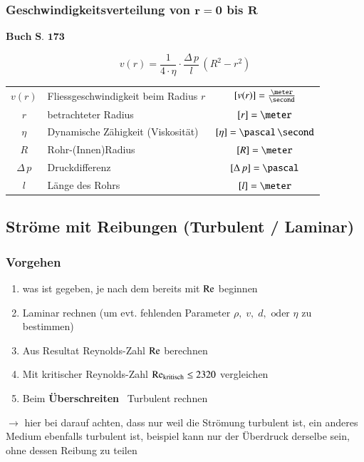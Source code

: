 \subsubsection{Geschwindigkeitsverteilung von $\bm{r=0}$ bis $\bm{R}$}
\begin{flushright}
	$\boxed{\textbf{Buch S. 173}}$
\end{flushright}


$$ \boxed{ v(r) = \frac{1}{4 \cdot \eta} \cdot \frac{\Delta \, p}{l} \, (R^2 - r^2) } $$

\renewcommand{\arraystretch}{1.3}
\begin{tabular}{c l c}
    $v(r)$                              & Fliessgeschwindigkeit beim Radius $r$ & $[v(r)] = \frac{\meter}{\second}$         \\
    $r$                                 & betrachteter Radius                   & $[r] = \meter$                            \\
    $\eta$                              & Dynamische Zähigkeit (Viskosität)     & $[\eta] = \pascal \, \second$             \\
    $R$                                 & Rohr-(Innen)Radius                    & $[R] = \meter$                            \\
    $\Delta \, p$                       & Druckdifferenz                        & $[\Delta \, p] = \pascal$                 \\
    $l$                                 & Länge des Rohrs                       & $[l] = \meter$
\end{tabular}
\renewcommand{\arraystretch}{1}

\subsection{Ströme mit Reibungen (Turbulent / Laminar)}

\subsubsection{Vorgehen}

\begin{enumerate}
	\item was ist gegeben, je nach dem bereits mit $\mathop{} \! \mathrm{Re}$ beginnen
	\item Laminar rechnen (um evt. fehlenden Parameter $\rho, \; v, \; d, \text{ oder } \eta$ zu bestimmen) 
	\item Aus Resultat Reynolds-Zahl $\mathop{} \! \mathrm{Re}$ berechnen
	\item Mit kritischer Reynolds-Zahl $\mathop{} \! \mathrm{Re}_{\rm kritisch} \le 2320$ vergleichen
	\item Beim \textbf{Überschreiten} \textrightarrow\ Turbulent rechnen
\end{enumerate}
$\rightarrow$ hier bei darauf achten, dass nur weil die Strömung turbulent ist, ein anderes Medium ebenfalls turbulent ist, beispiel kann nur der Überdruck derselbe sein, ohne dessen Reibung zu teilen


